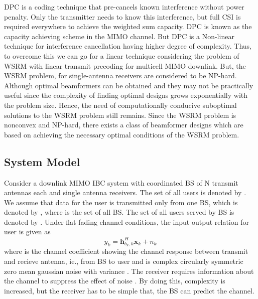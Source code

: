 \ac{DPC} is a coding technique that pre-cancels known interference without power penalty. Only the transmitter needs to know this  interference, but full \ac{CSI} is required everywhere to achieve the weighted sum capacity. \ac{DPC} is known as the capacity achieving scheme in the \ac{MIMO} channel. But \ac{DPC} is a Non-linear technique for interference cancellation having higher degree of complexity. Thus, to overcome this we can go for a linear technique considering the problem of  \ac{WSRM} with linear transmit precoding for multicell  \ac{MIMO} downlink. But, the \ac{WSRM} problem, for single-antenna receivers are considered to be NP-hard. Although 
optimal beamformers can be obtained and they may not be practically useful since the complexity of finding optimal designs grows exponentially with the problem size. Hence, the need of computationally conducive suboptimal solutions to the WSRM problem 
still remains. Since the \ac{WSRM} problem is nonconvex and NP-hard, there exists a class of beamformer designs which 
are based on achieving the necessary optimal conditions of the \ac{WSRM} problem.



\subsection{System Model}

Consider a downlink \ac{MIMO} \ac{IBC} system with  coordinated \ac{BS} of N transmit antennas each and  single antenna receivers. The set of all  users is denoted by . We assume that data for the  user is transmitted only from one BS, which is denoted by , where  is the set of all \ac{BS}. The set of all users served by BS  is denoted by . Under flat fading channel conditions, the input-output relation for  user is given as
\begin{equation}
y_k = \mathbf{h}_{b_k,k}^H \mathbf{x}_k  + {n}_k
\label{precoder1_eqn}
\end{equation}
where  is the channel coefficient showing the channel response between transmit and recieve antenna, ie., from \ac{BS}  to user  and  is complex circularly symmetric zero mean gaussian noise with variance  . The receiver requires information about the channel  to suppress the effect of noise . By doing this, complexity is increased, but the receiver has to be simple that, the \ac{BS} can predict the channel.

